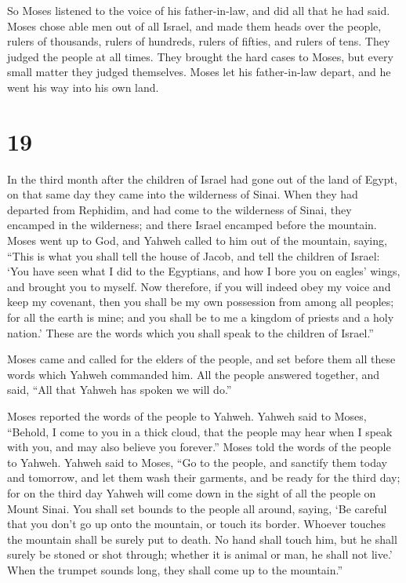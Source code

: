  So Moses listened to the voice of his father-in-law, and
did all that he had said.  Moses chose able men out of
all Israel, and made them heads over the people, rulers of thousands,
rulers of hundreds, rulers of fifties, and rulers of tens.
 They judged the people at all times. They brought the
hard cases to Moses, but every small matter they judged themselves.
 Moses let his father-in-law depart, and he went his way
into his own land.

\hypertarget{section-18}{%
\section{19}\label{section-18}}

 In the third month after the children of Israel had gone
out of the land of Egypt, on that same day they came into the wilderness
of Sinai.  When they had departed from Rephidim, and had
come to the wilderness of Sinai, they encamped in the wilderness; and
there Israel encamped before the mountain.  Moses went up
to God, and Yahweh called to him out of the mountain, saying, ``This is
what you shall tell the house of Jacob, and tell the children of Israel:
 `You have seen what I did to the Egyptians, and how I
bore you on eagles' wings, and brought you to myself.  Now
therefore, if you will indeed obey my voice and keep my covenant, then
you shall be my own possession from among all peoples; for all the earth
is mine;  and you shall be to me a kingdom of priests and
a holy nation.' These are the words which you shall speak to the
children of Israel.''

 Moses came and called for the elders of the people, and
set before them all these words which Yahweh commanded him.
 All the people answered together, and said, ``All that
Yahweh has spoken we will do.''

Moses reported the words of the people to Yahweh.  Yahweh
said to Moses, ``Behold, I come to you in a thick cloud, that the people
may hear when I speak with you, and may also believe you forever.''
Moses told the words of the people to Yahweh.  Yahweh
said to Moses, ``Go to the people, and sanctify them today and tomorrow,
and let them wash their garments,  and be ready for the
third day; for on the third day Yahweh will come down in the sight of
all the people on Mount Sinai.  You shall set bounds to
the people all around, saying, `Be careful that you don't go up onto the
mountain, or touch its border. Whoever touches the mountain shall be
surely put to death.  No hand shall touch him, but he
shall surely be stoned or shot through; whether it is animal or man, he
shall not live.' When the trumpet sounds long, they shall come up to the
mountain.''

